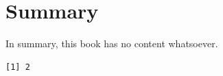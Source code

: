 \documentclass[
  11pt,
  letterpaper,
  DIV=11,
  numbers=noendperiod]{scrreprt}
\author{}
\date{}
\renewcommand*\contentsname{Table of contents}
\newcommand\contentsname{Table of contents}
\begin{document}
\renewcommand*\contentsname{Table of contents}
{
\setcounter{tocdepth}{2}
\tableofcontents
}

\chapter{Summary}\label{summary}

In summary, this book has no content whatsoever.

\begin{verbatim}
[1] 2
\end{verbatim}
\end{document}
